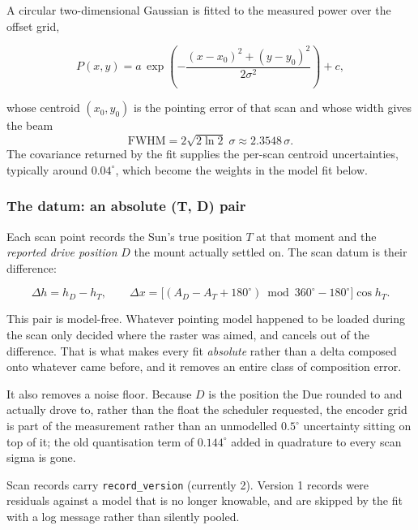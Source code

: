 \documentclass[11pt,a4paper]{article}
\begin{document}
A circular two-dimensional Gaussian is fitted to the measured power over the offset grid,

\begin{equation}
P(x, y) = a\,\exp\!\left(-\frac{(x - x_0)^2 + (y - y_0)^2}{2\sigma^2}\right) + c,
\end{equation}

whose centroid $(x_0, y_0)$ is the pointing error of that scan and whose width gives the beam
\begin{equation}
\text{FWHM} = 2\sqrt{2\ln 2}\;\sigma \approx 2.3548\,\sigma.
\end{equation}
The covariance returned by the fit supplies the per-scan centroid uncertainties, typically around $0.04^\circ$, which become the weights in the model fit below.

\subsubsection{The datum: an absolute (T, D) pair}

Each scan point records the Sun's true position $T$ at that moment and the \emph{reported drive position} $D$ the mount actually settled on. The scan datum is their difference:

\begin{equation}
\Delta h = h_D - h_T,
\qquad
\Delta x = \bigl[(A_D - A_T + 180^\circ) \bmod 360^\circ - 180^\circ\bigr]\cos h_T.
\end{equation}

This pair is model-free. Whatever pointing model happened to be loaded during the scan only decided where the raster was aimed, and cancels out of the difference. That is what makes every fit \emph{absolute} rather than a delta composed onto whatever came before, and it removes an entire class of composition error.

It also removes a noise floor. Because $D$ is the position the Due rounded to and actually drove to, rather than the float the scheduler requested, the encoder grid is part of the measurement rather than an unmodelled $0.5^\circ$ uncertainty sitting on top of it; the old quantisation term of $0.144^\circ$ added in quadrature to every scan sigma is gone.

Scan records carry \texttt{record\_version} (currently 2). Version 1 records were residuals against a model that is no longer knowable, and are skipped by the fit with a log message rather than silently pooled.
\end{document}
